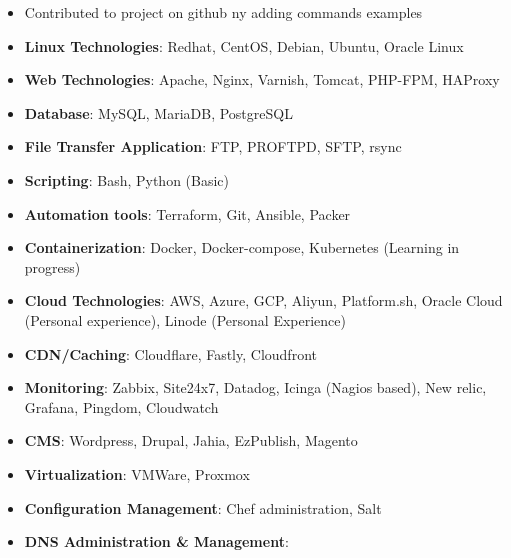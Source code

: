 \documentclass[10pt,a4paper,ragged2e,withhyper]{altacv}
\begin{document}
\begin{paracol}{2}

\begin{itemize}
\item Contributed to project on github ny adding commands examples
\end{itemize}

\divider

\switchcolumn

\newpage


\begin{itemize}[left=0pt]
    \item \textbf{\textcolor{PastelRed}{Linux Technologies}}: Redhat, CentOS, Debian, Ubuntu, Oracle Linux
    \item \textbf{\textcolor{PastelRed}{Web Technologies}}: Apache, Nginx, Varnish, Tomcat, PHP-FPM, HAProxy
    \item \textbf{\textcolor{PastelRed}{Database}}: MySQL, MariaDB, PostgreSQL
    \item \textbf{\textcolor{PastelRed}{File Transfer Application}}: FTP, PROFTPD, SFTP, rsync
    \item \textbf{\textcolor{PastelRed}{Scripting}}: Bash, Python (Basic)
    \item \textbf{\textcolor{PastelRed}{Automation tools}}: Terraform, Git, Ansible, Packer
    \item \textbf{\textcolor{PastelRed}{Containerization}}: Docker, Docker-compose, Kubernetes (Learning in progress)
    \item \textbf{\textcolor{PastelRed}{Cloud Technologies}}: AWS, Azure, GCP, Aliyun, Platform.sh, Oracle Cloud (Personal experience), Linode (Personal Experience)
    \item \textbf{\textcolor{PastelRed}{CDN/Caching}}: Cloudflare, Fastly, Cloudfront
    \item \textbf{\textcolor{PastelRed}{Monitoring}}: Zabbix, Site24x7, Datadog, Icinga (Nagios based), New relic, Grafana, Pingdom, Cloudwatch
    \item \textbf{\textcolor{PastelRed}{CMS}}: Wordpress, Drupal, Jahia, EzPublish, Magento
    \item \textbf{\textcolor{PastelRed}{Virtualization}}: VMWare, Proxmox
    \item \textbf{\textcolor{PastelRed}{Configuration Management}}: Chef administration, Salt
    \item \textbf{\textcolor{PastelRed}{DNS Administration \& Management}}: 

\end{itemize}
\end{paracol}
\end{document}
